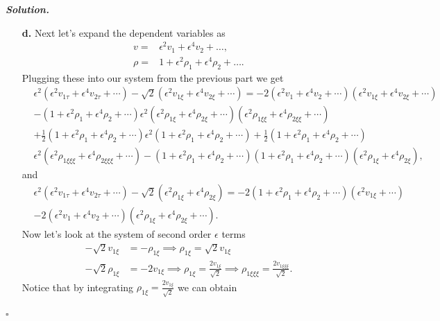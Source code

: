 \documentclass[12pt]{report}
\newenvironment{solution}[1][\it{Solution}]{\textbf{#1. } }{$\square$}
\def\eps{{\epsilon}}
\newcommand{\paren}[1]{{\left(#1\right)}} %
\begin{document}
\begin{solution}
\begin{enumerate}
        \item[{\bf d.}]   
        Next let's expand the dependent variables as
        \begin{align*}
            v=&\epsilon^2 v_1+\epsilon^4 v_2+\ldots, \\
            \rho=&1+\epsilon^2 \rho_1+\epsilon^4 \rho_2+\ldots.
        \end{align*}
        Plugging these into our system from the previous part we get
        \begin{align*}
            &\eps^2\paren{\eps^2 v_{1\tau} + \eps^4v_{2\tau} + \cdots} - \sqrt{2}\paren{\eps^2 v_{1\xi} + \eps^4v_{2\xi} + \cdots} = -2\paren{\eps^2 v_{1} + \eps^4v_{2} + \cdots}\paren{\eps^2 v_{1\xi} + \eps^4v_{2\xi} + \cdots} \\ 
            &- \paren{1 + \eps^2\rho_1 + \eps^4\rho_2 + \cdots}\eps^2\paren{\eps^2\rho_{1\xi} + \eps^4\rho_{2\xi} + \cdots}\paren{\eps^2\rho_{1\xi\xi} + \eps^4\rho_{2\xi\xi} + \cdots}\\
            &+ \frac{1}{2}\paren{1 + \eps^2\rho_1 + \eps^4\rho_2 + \cdots}\eps^2\paren{1 + \eps^2\rho_1 + \eps^4\rho_2 + \cdots} + \frac{1}{2}\paren{1 + \eps^2\rho_1 + \eps^4\rho_2 + \cdots}\\ 
            &\eps^2\paren{\eps^2\rho_{1\xi\xi\xi} + \eps^4\rho_{2\xi\xi\xi} + \cdots} - \paren{1 + \eps^2\rho_1 + \eps^4\rho_2 + \cdots}\paren{1 + \eps^2\rho_1 + \eps^4\rho_2 + \cdots}\paren{\eps^2\rho_{1\xi} + \eps^4\rho_{2\xi}},
        \end{align*}
        and 
        \begin{align*}
            &\eps^2\paren{\eps^2 v_{1\tau} + \eps^4v_{2\tau} + \cdots} - \sqrt{2} \paren{\eps^2 \rho_{1\xi} + \eps^4\rho_{2\xi}} = -2\paren{1 + \eps^2\rho_1 + \eps^4\rho_2 + \cdots}(\eps^2v_{1\xi} + \cdots)\\
            &-2(\eps^2v_1 + \eps^4v_2 + \cdots)(\eps^2\rho_{1\xi} + \eps^4\rho_{2\xi} + \cdots).
        \end{align*}
        Now let's look at the system of second order $\eps$ terms
        \begin{align*}
            -\sqrt{2} v_{1\xi} &= - \rho_{1\xi} \implies \rho_{1\xi} = \sqrt{2} v_{1\xi}\\
            -\sqrt{2} \rho_{1\xi} &= -2 v_{1\xi} \implies \rho_{1\xi} = \frac{2 v_{1\xi}}{\sqrt{2}} \implies \rho_{1\xi\xi\xi} = \frac{2v_{1\xi\xi\xi}}{\sqrt{2}}.
        \end{align*}
        Notice that by integrating $\rho_{1\xi} = \frac{2 v_{1\xi}}{\sqrt{2}}$ we can obtain

\end{enumerate}
\end{solution}
\end{document}
